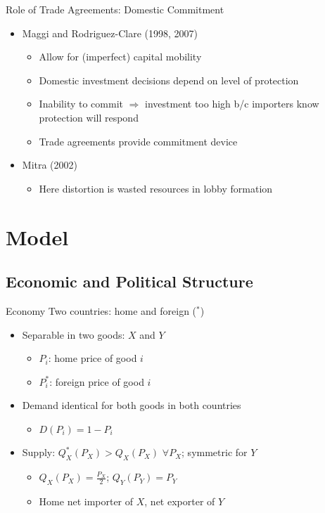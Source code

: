 \documentclass[handout]{beamer}
\begin{document}
\begin{frame}{Role of Trade Agreements: Domestic Commitment}
\pause
\begin{itemize}[<+->]
	\item Maggi and Rodriguez-Clare (1998, 2007)
		\begin{itemize}
			\item Allow for (imperfect) capital mobility
			\item Domestic investment decisions depend on level of protection
			\item Inability to commit $\Rightarrow$ investment too high b/c importers know protection will respond
			\item Trade agreements provide commitment device
    \end{itemize}
	\item Mitra (2002)
		\begin{itemize}
			\item Here distortion is wasted resources in lobby formation
		\end{itemize}
\end{itemize}
\end{frame} 





\section{Model}
\subsection{Economic and Political Structure}
\begin{frame}{Economy}
Two countries: home and foreign (${}^*$)
\pause
\begin{itemize}[<+->]
	\item Separable in two goods: $X$ and $Y$
			\begin{itemize}
				\item $P_i$: home price of good $i$
				\item $P_i^*$: foreign price of good $i$
			\end{itemize}
	\item Demand identical for both goods in both countries
		\begin{itemize}
			\item $D(P_i) = 1 - P_i$
		\end{itemize}
	\item Supply: $Q_X^*(P_X) > Q_X(P_X)$ $\forall P_X$; symmetric for $Y$ 
		\begin{itemize}
			\item $Q_X(P_X) = \frac{P_X}{2}$; $Q_Y(P_Y) = P_Y$
			\item Home net importer of $X$, net exporter of $Y$
		\end{itemize}
\end{itemize}

\end{frame}
\end{document}
